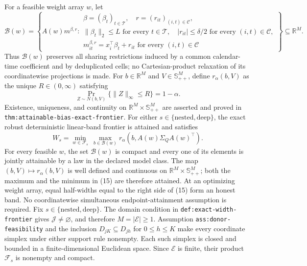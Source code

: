 For a feasible weight array \(w\), let
\[
 \mathcal B(w)=\left\{A(w)m^{\beta,r}:
 \begin{array}{l}
 \beta=(\beta_t)_{t\in\mathcal T},\quad
 r=(r_{it})_{(i,t)\in\mathcal C},\\
 \lVert\beta_t\rVert_2\leq L\text{ for every }t\in\mathcal T,\quad
 |r_{it}|\leq\delta/2\text{ for every }(i,t)\in\mathcal C,\\
 m^{\beta,r}_{it}=x_i^{\top}\beta_t+r_{it}
 \text{ for every }(i,t)\in\mathcal C
 \end{array}\right\}\subseteq\mathbb R^M.
\]
Thus \(\mathcal B(w)\) preserves all sharing restrictions induced by a common
calendar-time coefficient and by deduplicated cells; no Cartesian-product
relaxation of its coordinatewise projections is made.
For \(b\in\mathbb R^M\) and \(V\in\mathbb S_{++}^M\), define
\(r_\alpha(b,V)\) as the unique \(R\in(0,\infty)\) satisfying
\[
 \Pr_{Z\sim N(b,V)}\{\lVert Z\rVert_\infty\leq R\}=1-\alpha.
\]
Existence, uniqueness, and continuity on
\(\mathbb R^M\times\mathbb S_{++}^M\) are asserted and proved in
\texttt{thm:attainable-bias-exact-frontier}.
For either \(s\in\{\mathrm{nested},\mathrm{deep}\}\), the exact robust
deterministic linear-band frontier is attained and satisfies
\[
 W_s=\min_{w\in\mathcal F_s}\ \max_{b\in\mathcal B(w)}
 r_\alpha\!\left(b,A(w)\Sigma_QA(w)^{\top}\right). \tag{15}
\]
For every feasible \(w\), the set \(\mathcal B(w)\) is compact and every one
of its elements is jointly attainable by a law in the declared model class.
The map \((b,V)\mapsto r_\alpha(b,V)\) is well defined and continuous on
\(\mathbb R^M\times\mathbb S_{++}^M\); both the maximum and the minimum in
(15) are therefore attained.  At an optimizing weight array, equal
half-widths equal to the right side of (15) form an honest band.  No
coordinatewise simultaneous endpoint-attainment assumption is required.
Fix \(s\in\{\mathrm{nested},\mathrm{deep}\}\).  The domain condition in
\texttt{def:exact-width-frontier} gives \(\mathcal J\ne\varnothing\), and
therefore \(M=|\mathcal E|\geq1\).  Assumption
\texttt{ass:donor-feasibility} and the inclusion
\(D_{jK}\subseteq D_{jh}\) for \(0\leq h\leq K\) make every coordinate
simplex under either support rule nonempty.  Each such simplex is closed and
bounded in a finite-dimensional Euclidean space.  Since \(\mathcal E\) is
finite, their product \(\mathcal F_s\) is nonempty and compact.

